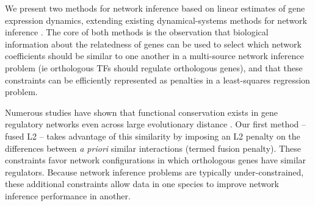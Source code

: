 \documentclass[11pt]{article}
\begin{document}
We present two methods for network inference based on linear estimates of gene expression dynamics, extending existing dynamical-systems methods for network inference \cite{bonneau_predictive_2007, arrieta-ortiz_experimentally_2015, yeung_reverse_2002}. The core of both methods is the observation that biological information about the relatedness of genes can be used to select which network coefficients should be similar to one another in a multi-source network inference problem (ie orthologous TFs should regulate orthologous genes), and that these constraints can be efficiently represented as penalties in a least-squares regression problem.



Numerous studies have shown that functional conservation exists in gene regulatory networks even across large evolutionary distance \cite{satou2006gene, hinman2009evolution,tanay2005conservation,erwin2009evolution}. Our first method -- fused L2 -- takes advantage of this similarity by imposing an L2 penalty on the differences between \textit{a priori} similar interactions (termed fusion penalty). These constraints favor  network configurations in which orthologous genes have similar regulators. Because network inference problems are typically under-constrained, these additional constraints allow data in one species to improve network inference performance in another.
\end{document}
